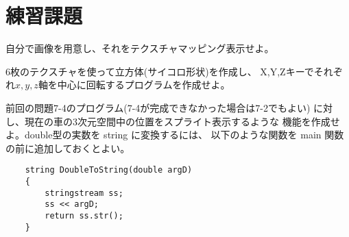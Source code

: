 \section{練習課題} \label{sec:08-q}
\begin{description}
 \myitem 自分で画像を用意し、それをテクスチャマッピング表示せよ。

 \myitem 6枚のテクスチャを使って立方体(サイコロ形状)を作成し、
	X,Y,Zキーでそれぞれ\(x,y,z\)軸を中心に回転するプログラムを作成せよ。

 \myitem 前回の問題7-4のプログラム(7-4が完成できなかった場合は7-2でもよい)
	に対し、現在の車の3次元空間中の位置をスプライト表示するような
	機能を作成せよ。double型の実数を string に変換するには、
	以下のような関数を main 関数の前に追加しておくとよい。
	\begin{screen}
	\begin{verbatim}
	string DoubleToString(double argD)
	{
	    stringstream ss;
	    ss << argD;
	    return ss.str();
	}
	\end{verbatim}
	\end{screen}

\end{description}
